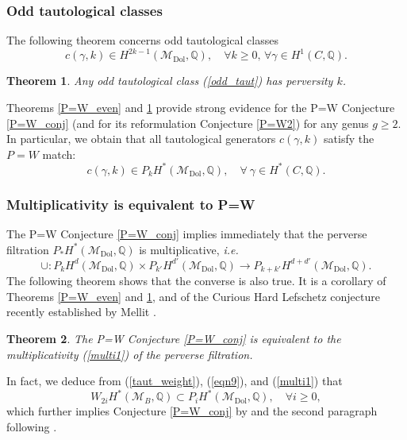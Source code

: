 \documentclass[11pt]{amsart}
\theoremstyle{plain}
\newtheorem{thm}{Theorem}[section]
\theoremstyle{definition}
\theoremstyle{remark}
\newcommand{\BQ}{{\mathbb{Q}}}
\newcommand{\CM}{{\mathcal M}}
\begin{document}
\subsubsection{Odd tautological classes}
The following theorem concerns odd tautological classes
\begin{equation}\label{odd_taut}
c(\gamma, k) \in H^{2k-1}(\CM_{\mathrm{Dol}}, \BQ), \quad \forall k \geq 0, \, \forall \gamma \in H^1(C, \BQ).
\end{equation}

\begin{thm}\label{P=W_odd}
Any odd tautological class (\ref{odd_taut}) has perversity $k$.
\end{thm}

Theorems \ref{P=W_even} and \ref{P=W_odd} provide strong evidence for the P=W Conjecture
\ref{P=W_conj} (and for its reformulation Conjecture \ref{P=W2}) for any genus $g \geq 2$. In particular, we obtain that all tautological generators $c(\gamma,k)$ satisfy the $P=W$ match:
\begin{equation}\label{eqn9}
    c(\gamma, k) \in P_k H^*(\CM_{\mathrm{Dol}}, \BQ),\quad \forall~ \gamma \in H^*(C, \BQ).
\end{equation}

\subsubsection{Multiplicativity is equivalent to P=W} The P=W Conjecture \ref{P=W_conj}  implies immediately that the perverse filtration $P_*H^*(\CM_{\mathrm{Dol}}, \BQ)$ is multiplicative, \emph{i.e.}
\begin{equation}\label{multi1}
\cup: P_k H^d(\CM_\mathrm{Dol}, \BQ)\times P_{k'} H^{d'}(\CM_\mathrm{Dol}, \BQ) \to P_{k+k'} H^{d+d'}(\CM_\mathrm{Dol}, \BQ).
\end{equation}
The following theorem shows that the converse is also true. It is a corollary of Theorems \ref{P=W_even} and \ref{P=W_odd}, and of the Curious Hard Lefschetz conjecture recently established by Mellit \cite{Mellit}.

\begin{thm}\label{last}
The P=W Conjecture \ref{P=W_conj} is equivalent to the multiplicativity (\ref{multi1}) of the perverse filtration.
\end{thm}

In fact, we deduce from (\ref{taut_weight}), (\ref{eqn9}), and (\ref{multi1}) that
\[
W_{2i}H^*(\CM_B, \BQ) \subset P_iH^*(\CM_{\mathrm{Dol}}, \BQ), \quad \forall i\geq 0,
\]
which further implies Conjecture \ref{P=W_conj} by \cite[Theorem 1.5.3]{Mellit}
and the second paragraph following \cite[Corollary 1.5.4]{Mellit}.
\end{document}
